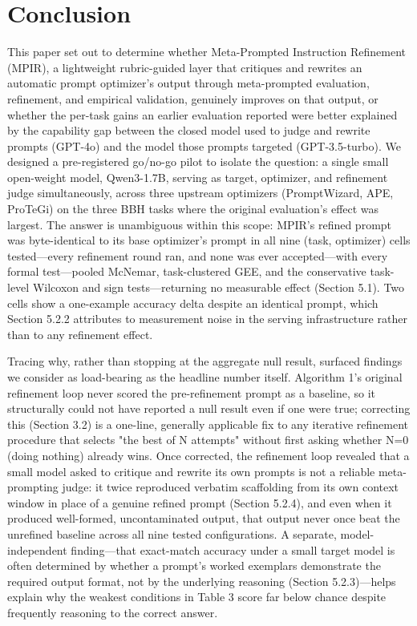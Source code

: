 \documentclass[a4paper,fleqn]{cas-sc}
\begin{document}
\section{Conclusion}

This paper set out to determine whether Meta-Prompted Instruction Refinement (MPIR), a lightweight rubric-guided layer that critiques and rewrites an automatic prompt optimizer's output through meta-prompted evaluation, refinement, and empirical validation, genuinely improves on that output, or whether the per-task gains an earlier evaluation reported were better explained by the capability gap between the closed model used to judge and rewrite prompts (GPT-4o) and the model those prompts targeted (GPT-3.5-turbo). We designed a pre-registered go/no-go pilot to isolate the question: a single small open-weight model, Qwen3-1.7B, serving as target, optimizer, and refinement judge simultaneously, across three upstream optimizers (PromptWizard, APE, ProTeGi) on the three BBH tasks where the original evaluation's effect was largest. The answer is unambiguous within this scope: MPIR's refined prompt was byte-identical to its base optimizer's prompt in all nine (task, optimizer) cells tested---every refinement round ran, and none was ever accepted---with every formal test---pooled McNemar, task-clustered GEE, and the conservative task-level Wilcoxon and sign tests---returning no measurable effect (Section 5.1). Two cells show a one-example accuracy delta despite an identical prompt, which Section 5.2.2 attributes to measurement noise in the serving infrastructure rather than to any refinement effect.

Tracing why, rather than stopping at the aggregate null result, surfaced findings we consider as load-bearing as the headline number itself. Algorithm 1's original refinement loop never scored the pre-refinement prompt as a baseline, so it structurally could not have reported a null result even if one were true; correcting this (Section 3.2) is a one-line, generally applicable fix to any iterative refinement procedure that selects "the best of N attempts" without first asking whether N=0 (doing nothing) already wins. Once corrected, the refinement loop revealed that a small model asked to critique and rewrite its own prompts is not a reliable meta-prompting judge: it twice reproduced verbatim scaffolding from its own context window in place of a genuine refined prompt (Section 5.2.4), and even when it produced well-formed, uncontaminated output, that output never once beat the unrefined baseline across all nine tested configurations. A separate, model-independent finding---that exact-match accuracy under a small target model is often determined by whether a prompt's worked exemplars demonstrate the required output format, not by the underlying reasoning (Section 5.2.3)---helps explain why the weakest conditions in Table 3 score far below chance despite frequently reasoning to the correct answer.
\end{document}
